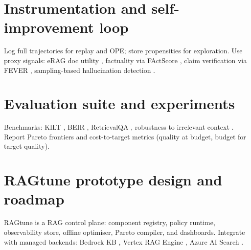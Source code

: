 \documentclass[11pt,a4paper]{article}
\begin{document}
\section{Instrumentation and self-improvement loop}
Log full trajectories for replay and OPE; store propensities for exploration.
Use proxy signals: eRAG doc utility \cite{Salemi2024ERAG}, factuality via FActScore \cite{Min2023FActScore},
claim verification via FEVER \cite{Thorne2018FEVER}, sampling-based hallucination detection \cite{Manakul2023SelfCheckGPT}.

\section{Evaluation suite and experiments}
Benchmarks: KILT \cite{Petroni2021KILT}, BEIR \cite{Thakur2021BEIR}, RetrievalQA \cite{Zhang2024RetrievalQA},
robustness to irrelevant context \cite{Yoran2024RobustRAG}.
Report Pareto frontiers and cost-to-target metrics (quality at budget, budget for target quality).

\section{RAGtune prototype design and roadmap}
RAGtune is a RAG control plane: component registry, policy runtime, observability store, offline optimiser,
Pareto compiler, and dashboards. Integrate with managed backends: Bedrock KB \cite{AWSBedrockKB},
Vertex RAG Engine \cite{VertexRAGOverview}, Azure AI Search \cite{AzureAISearchRAG2026}.



\end{document}
